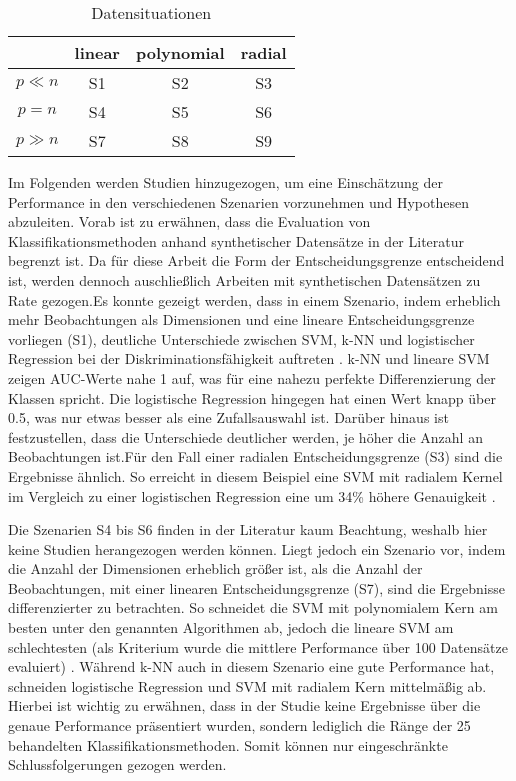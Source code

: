 \documentclass[
]{article}
\begin{document}
\begin{table}[h]
\begin{center}
\begin{tabular}{ |c|c|c|c| }
 \hline
  & linear & polynomial & radial \\
 \hline
 $p \ll n$ & S1 & S2 & S3 \\
 \hline
 $p = n$ & S4 & S5 & S6 \\
 \hline
 $p \gg n$ & S7 & S8 & S9 \\
 \hline
\end{tabular}
\end{center}
\caption{Datensituationen}
\label{tab:datensituationen}
\end{table}

Im Folgenden werden Studien hinzugezogen, um eine Einschätzung der
Performance in den verschiedenen Szenarien vorzunehmen und Hypothesen
abzuleiten. Vorab ist zu erwähnen, dass die Evaluation von
Klassifikationsmethoden anhand synthetischer Datensätze in der Literatur
begrenzt ist. Da für diese Arbeit die Form der Entscheidungsgrenze
entscheidend ist, werden dennoch auschließlich Arbeiten mit
synthetischen Datensätzen zu Rate gezogen.\newline Es konnte gezeigt
werden, dass in einem Szenario, indem erheblich mehr Beobachtungen als
Dimensionen und eine lineare Entscheidungsgrenze vorliegen (S1),
deutliche Unterschiede zwischen SVM, k-NN und logistischer Regression
bei der Diskriminationsfähigkeit auftreten
\parencite{entezari-malekiComparisonClassificationMethods2009}. k-NN und
lineare SVM zeigen AUC-Werte nahe 1 auf, was für eine nahezu perfekte
Differenzierung der Klassen spricht. Die logistische Regression hingegen
hat einen Wert knapp über 0.5, was nur etwas besser als eine
Zufallsauswahl ist. Darüber hinaus ist festzustellen, dass die
Unterschiede deutlicher werden, je höher die Anzahl an Beobachtungen
ist.\newline Für den Fall einer radialen Entscheidungsgrenze (S3) sind
die Ergebnisse ähnlich. So erreicht in diesem Beispiel eine SVM mit
radialem Kernel im Vergleich zu einer logistischen Regression eine um
34\% höhere Genauigkeit
\parencite{faveroClassificationPerformanceEvaluation2022}.

Die Szenarien S4 bis S6 finden in der Literatur kaum Beachtung, weshalb
hier keine Studien herangezogen werden können. Liegt jedoch ein Szenario
vor, indem die Anzahl der Dimensionen erheblich größer ist, als die
Anzahl der Beobachtungen, mit einer linearen Entscheidungsgrenze (S7),
sind die Ergebnisse differenzierter zu betrachten. So schneidet die SVM
mit polynomialem Kern am besten unter den genannten Algorithmen ab,
jedoch die lineare SVM am schlechtesten (als Kriterium wurde die
mittlere Performance über 100 Datensätze evaluiert)
\parencite{scholzComparisonClassificationMethods2021}. Während k-NN auch
in diesem Szenario eine gute Performance hat, schneiden logistische
Regression und SVM mit radialem Kern mittelmäßig ab. Hierbei ist wichtig
zu erwähnen, dass in der Studie keine Ergebnisse über die genaue
Performance präsentiert wurden, sondern lediglich die Ränge der 25
behandelten Klassifikationsmethoden. Somit können nur eingeschränkte
Schlussfolgerungen gezogen werden.
\end{document}
